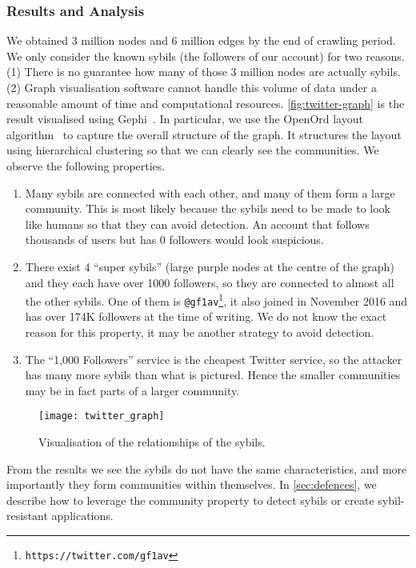 \subsubsection{Results and Analysis}
We obtained 3 million nodes and 6 million edges by the end of crawling period.
We only consider the known sybils (the followers of our account) for two reasons.
(1) There is no guarantee how many of those 3 million nodes are actually sybils.
(2) Graph visualisation software cannot handle this volume of data under a
reasonable amount of time and computational resources.
\autoref{fig:twitter-graph} is the result visualised using
Gephi~\cite{bastian2009gephi}. In particular, we use the OpenOrd layout
algorithm~\cite{martin2011openord} to capture the overall structure of the
graph. It structures the layout using hierarchical clustering so that we can
clearly see the communities. We observe the following properties.
\begin{enumerate}
  \item Many sybils are connected with each other, and many of them form a large
    community. This is most likely because the sybils need to be made to look like
    humans so that they can avoid detection. An account that follows thousands of
    users but has 0 followers would look suspicious.
  \item There exist 4 ``super sybils'' (large purple nodes at the centre of the
    graph) and they each have over 1000 followers, so they are connected to
    almost all the other sybils. One of them is
    \verb!@gf1av!\footnote{\texttt{https://twitter.com/gf1av}}, it also joined
    in November 2016 and has over 174K followers at the time of writing. We do
    not know the exact reason for this property, it may be another strategy to
    avoid detection.
  \item The ``1,000 Followers'' service is the cheapest Twitter service, so the
    attacker has many more sybils than what is pictured. Hence the smaller
    communities may be in fact parts of a larger community.
\end{enumerate}

\begin{figure}
  \centering
  \texttt{[image: twitter\_graph]}
  \caption{Visualisation of the relationships of the sybils. }
  \label{fig:twitter-graph}
\end{figure}

From the results we see the sybils do not have the same characteristics, and
more importantly they form communities within themselves. In
\autoref{sec:defences}, we describe how to leverage the community property to
detect sybils or create sybil-resistant applications.

